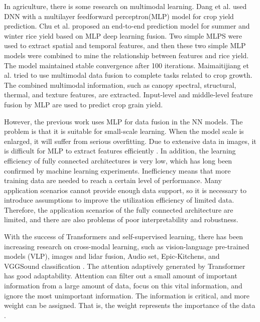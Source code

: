 \documentclass[acmsmall,manuscript, screen, review]{acmart}
\begin{document}
 In agriculture, there is some research on multimodal learning. Dang et al. \cite{dang2021autumn} used DNN with a multilayer feedforward perceptron(MLP) model for crop yield prediction. Chu et al. \cite{chu_end--end_2020} proposed an end-to-end prediction model for summer and winter rice yield based on MLP deep learning fusion. Two simple MLPS were used to extract spatial and temporal features, and then these two simple MLP models were combined to mine the relationship between features and rice yield. The model maintained stable convergence after 100 iterations. Maimaitijiang et al. \cite{maimaitijiang_soybean_2020} tried to use multimodal data fusion to complete tasks related to crop growth. The combined multimodal information, such as canopy spectral, structural, thermal, and texture features, are extracted. Input-level and middle-level feature fusion by MLP are used to predict crop grain yield.

However, the previous work uses MLP for data fusion in the NN models. The problem is that it is suitable for small-scale learning. When the model scale is enlarged, it will suffer from serious overfitting. Due to extensive data in images, it is difficult for MLP to extract features efficiently \cite{zhao_battle_2021}. In addition, the learning efficiency of fully connected architectures is very low, which has long been confirmed by machine learning experiments. Inefficiency means that more training data are needed to reach a certain level of performance. Many application scenarios cannot provide enough data support, so it is necessary to introduce assumptions to improve the utilization efficiency of limited data. Therefore, the application scenarios of the fully connected architecture are limited, and there are also problems of poor interpretability and robustness.

With the success of Transformers and self-supervised learning, there has been increasing research on cross-modal learning, such as vision-language pre-trained models (VLP)\cite{clevers_remote_2013}, images and lidar fusion\cite{prakash_multi-modal_2021}, Audio set, Epic-Kitchens, and VGGSound classification \cite{nagrani_attention_nodate}. The attention adaptively generated by Transformer has good adaptability. Attention can filter out a small amount of important information from a large amount of data, focus on this vital information, and ignore the most unimportant information. The information is critical, and more weight can be assigned. That is, the weight represents the importance of the data \cite{vaswani_attention_2017}.
\end{document}
